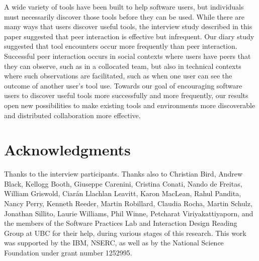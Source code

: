 \documentclass[smallextended]{svjour3}
\newcommand\discovery{peer interaction\xspace}
\newcommand\idrg[1]{\nb{IDRG}{#1}}
\begin{document}
\noindent
A wide variety of tools have been built to help software users, but individuals
must necessarily discover those tools before they can be used.
While there are many ways that users discover useful tools, 
the interview study described in this paper suggested that
\discovery is effective but infrequent. 
Our diary study suggested that tool encounters occur
more frequently than \discovery.
Successful \discovery occurs in social contexts where users have 
peers that they can observe, such as in a collocated team, 
but also in technical contexts where such observations are 
facilitated, such as when one user can see the outcome of another
user's tool use.
Towards our goal of encouraging software users to 
discover useful tools more successfully and more frequently,
our results open new possibilities to make existing tools and environments more
discoverable and distributed collaboration more effective.


\idrg{page numbers}

\section*{Acknowledgments}

\noindent
Thanks to the interview participants.
Thanks also to
Christian Bird,
Andrew Black,
Kellogg Booth,
Giuseppe Carenini,
Cristina Conati,
Nando de Freitas,
William Griswold,
Ciar\'an Llachlan Leavitt,
Karon MacLean,
Rahul Pandita,
Nancy Perry,
Kenneth Reeder,
Martin Robillard,
Claudia Rocha,
Martin Schulz,
Jonathan Sillito,
Laurie Williams,
Phil Winne,
Petcharat Viriyakattiyaporn,
and the members of the Software Practices Lab and
Interaction Design Reading Group at UBC
for their help, during various stages of this research.
This work was supported by the IBM, NSERC,
as well as 
by the National Science Foundation under grant number 1252995.



\end{document}
